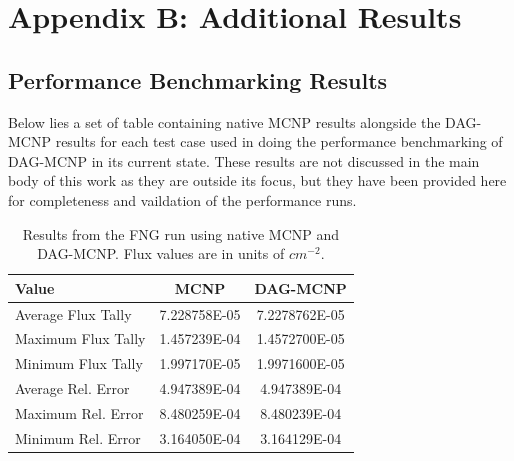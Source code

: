 \documentclass[12pt, a4paper]{article}
\begin{document}






\section{Appendix B: Additional Results}%

\subsection{Performance Benchmarking Results}%

Below lies a set of table containing native MCNP results alongside the DAG-MCNP results for each test case used in doing the performance benchmarking of DAG-MCNP in its current state. These results are not discussed in the main body of this work as they are outside its focus, but they have been provided here for completeness and vaildation of the performance runs.

\begin{table}[H]
  \caption{Results from the FNG run using native MCNP and DAG-MCNP. Flux values are in units of  $cm^{-2}$.}
  \label{fng_perf_results}
  \centering
  \begin{tabular}{l c c}
    \toprule
    Value & MCNP & DAG-MCNP \\
    \hline
    Average Flux Tally & 7.228758E-05 & 7.2278762E-05 \\
    \hline
    Maximum Flux Tally & 1.457239E-04 & 1.4572700E-05 \\
    \hline
    Minimum Flux Tally & 1.997170E-05 & 1.9971600E-05 \\
    \hline
    Average Rel. Error & 4.947389E-04 & 4.947389E-04 \\
    \hline
    Maximum Rel. Error & 8.480259E-04 & 8.480239E-04 \\
    \hline
    Minimum Rel. Error & 3.164050E-04 & 3.164129E-04 \\
    \bottomrule
  \end{tabular}  
\end{table}
\end{document}
